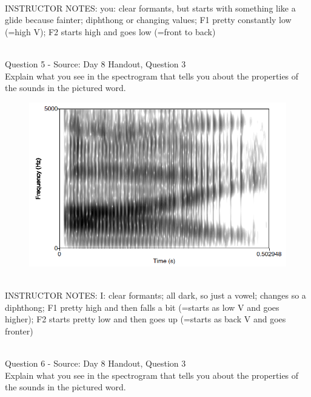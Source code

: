 \documentclass[12pt]{article}
\begin{document}
~\\
INSTRUCTOR NOTES: you: clear formants, but starts with something like a glide because fainter; diphthong or changing values; F1 pretty constantly low (=high V); F2 starts high and goes low (=front to back)


~\\

{\large Question 5} - Source: Day 8 Handout, Question 3\\

Explain what you see in the spectrogram that tells you about the properties of the sounds in the pictured word.\\

\begin{figure}[H]
\includegraphics{../images/spectrogram_I.png}
\end{figure}

~\\
INSTRUCTOR NOTES: I: clear formants; all dark, so just a vowel; changes so a diphthong; F1 pretty high and then falls a bit (=starts as low V and goes higher); F2 starts pretty low and then goes up (=starts as back V and goes fronter)


~\\

{\large Question 6} - Source: Day 8 Handout, Question 3\\

Explain what you see in the spectrogram that tells you about the properties of the sounds in the pictured word.\\
\end{document}
